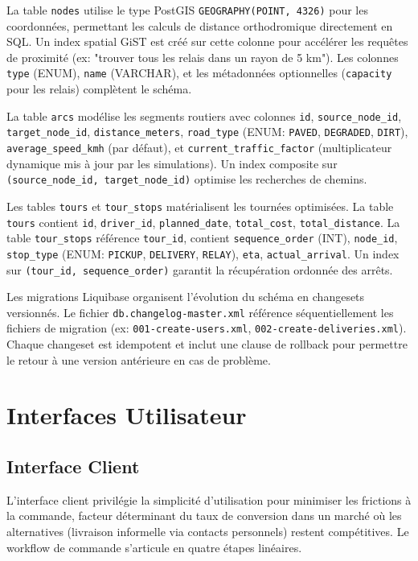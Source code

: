 La table \texttt{nodes} utilise le type PostGIS \texttt{GEOGRAPHY(POINT, 4326)} pour les coordonnées, permettant les calculs de distance orthodromique directement en SQL. Un index spatial GiST est créé sur cette colonne pour accélérer les requêtes de proximité (ex: "trouver tous les relais dans un rayon de 5 km"). Les colonnes \texttt{type} (ENUM), \texttt{name} (VARCHAR), et les métadonnées optionnelles (\texttt{capacity} pour les relais) complètent le schéma.

La table \texttt{arcs} modélise les segments routiers avec colonnes \texttt{id}, \texttt{source\_node\_id}, \texttt{target\_node\_id}, \texttt{distance\_meters}, \texttt{road\_type} (ENUM: \texttt{PAVED}, \texttt{DEGRADED}, \texttt{DIRT}), \texttt{average\_speed\_kmh} (par défaut), et \texttt{current\_traffic\_factor} (multiplicateur dynamique mis à jour par les simulations). Un index composite sur \texttt{(source\_node\_id, target\_node\_id)} optimise les recherches de chemins.

Les tables \texttt{tours} et \texttt{tour\_stops} matérialisent les tournées optimisées. La table \texttt{tours} contient \texttt{id}, \texttt{driver\_id}, \texttt{planned\_date}, \texttt{total\_cost}, \texttt{total\_distance}. La table \texttt{tour\_stops} référence \texttt{tour\_id}, contient \texttt{sequence\_order} (INT), \texttt{node\_id}, \texttt{stop\_type} (ENUM: \texttt{PICKUP}, \texttt{DELIVERY}, \texttt{RELAY}), \texttt{eta}, \texttt{actual\_arrival}. Un index sur \texttt{(tour\_id, sequence\_order)} garantit la récupération ordonnée des arrêts.

Les migrations Liquibase organisent l'évolution du schéma en changesets versionnés. Le fichier \texttt{db.changelog-master.xml} référence séquentiellement les fichiers de migration (ex: \texttt{001-create-users.xml}, \texttt{002-create-deliveries.xml}). Chaque changeset est idempotent et inclut une clause de rollback pour permettre le retour à une version antérieure en cas de problème.

\section{Interfaces Utilisateur}

\subsection{Interface Client}

L'interface client privilégie la simplicité d'utilisation pour minimiser les frictions à la commande, facteur déterminant du taux de conversion dans un marché où les alternatives (livraison informelle via contacts personnels) restent compétitives. Le workflow de commande s'articule en quatre étapes linéaires.

